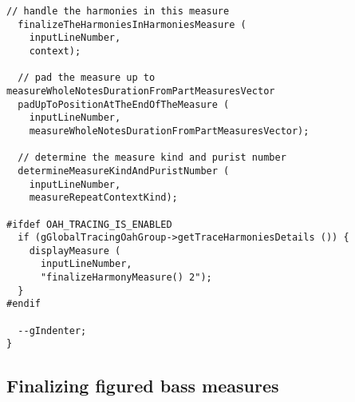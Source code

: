 \begin{lstlisting}[language=CPlusPlus]
  // handle the harmonies in this measure
  finalizeTheHarmoniesInHarmoniesMeasure (
    inputLineNumber,
    context);

  // pad the measure up to measureWholeNotesDurationFromPartMeasuresVector
  padUpToPositionAtTheEndOfTheMeasure (
    inputLineNumber,
    measureWholeNotesDurationFromPartMeasuresVector);

  // determine the measure kind and purist number
  determineMeasureKindAndPuristNumber (
    inputLineNumber,
    measureRepeatContextKind);

#ifdef OAH_TRACING_IS_ENABLED
  if (gGlobalTracingOahGroup->getTraceHarmoniesDetails ()) {
    displayMeasure (
      inputLineNumber,
      "finalizeHarmonyMeasure() 2");
  }
#endif

  --gIndenter;
}
\end{lstlisting}


\subsection{Finalizing figured bass measures}

